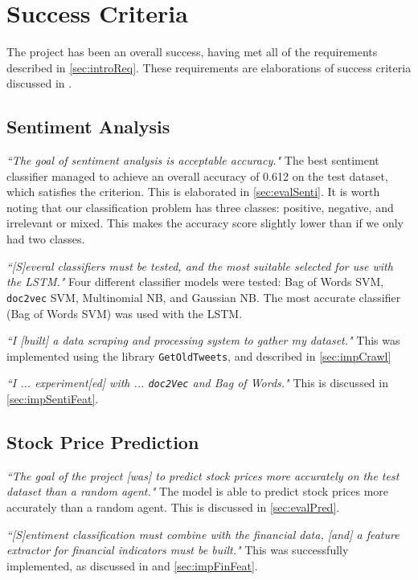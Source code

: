 \documentclass[12pt,a4paper,twoside,openright]{report}
\begin{document}
\section{Success Criteria}
\label{evalSuccess}

The project has been an overall success, having met all of the requirements described
in \cref{sec:introReq}. These requirements are elaborations of success criteria discussed
in .

\subsection*{Sentiment Analysis}

\textit{``The goal of sentiment analysis is acceptable accuracy."}
The best sentiment classifier managed to achieve an overall accuracy of 0.612
on the test dataset, which satisfies the criterion. This is elaborated in \cref{sec:evalSenti}.
It is worth noting that
our classification problem has three classes: positive, negative, and irrelevant or mixed.
This makes the accuracy score slightly lower than if we only had two classes.

\textit{``[S]everal classifiers must be
tested, and the most suitable selected for use
with the LSTM."} Four different classifier models were
tested: Bag of Words SVM, \texttt{doc2vec} SVM, Multinomial
NB, and Gaussian NB. The most accurate classifier (Bag of Words SVM)
was used with the LSTM.

\textit{``I [built] a data scraping and processing
system to gather my dataset."} This was implemented using
the library \texttt{GetOldTweets}, and described in \cref{sec:impCrawl}

\textit{``I ... experiment[ed] with ...
\texttt{doc2Vec}\cite{Le14} and Bag of Words."}
This is discussed in \cref{sec:impSentiFeat}.


\subsection*{Stock Price Prediction}

\textit{``The goal of the project [was] to predict stock
prices more accurately on the test dataset than a random agent."}
The model is able to predict stock prices more accurately
than a random agent. This is discussed in \cref{sec:evalPred}.

\textit{``[S]entiment classification must combine with the financial data,
[and] a feature extractor for financial
indicators must be built."}
This was successfully implemented, as discussed in  and \cref{sec:impFinFeat}.
\end{document}
